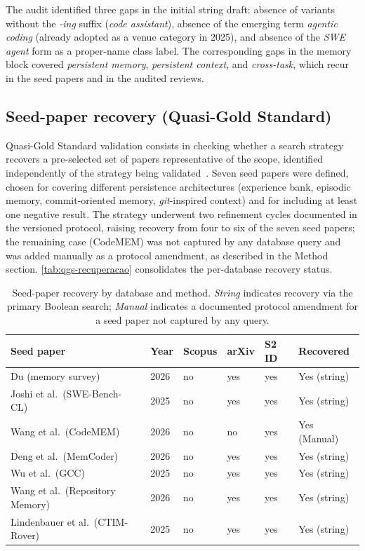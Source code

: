 The audit identified three gaps in the initial string draft: absence of variants without the
\textit{-ing} suffix (\textit{code assistant}), absence of the emerging term \textit{agentic
coding} (already adopted as a venue category in 2025), and absence of the \textit{SWE agent}
form as a proper-name class label.
The corresponding gaps in the memory block covered \textit{persistent memory},
\textit{persistent context}, and \textit{cross-task}, which recur in the seed papers and in
the audited reviews.

\subsection{Seed-paper recovery (Quasi-Gold Standard)}
\label{ap:qgs}

Quasi-Gold Standard validation consists in checking whether a search strategy recovers a
pre-selected set of papers representative of the scope, identified independently of the
strategy being validated~\citep{mourao2020hybrid}.
Seven seed papers were defined, chosen for covering different persistence architectures
(experience bank, episodic memory, commit-oriented memory, \textit{git}-inspired context)
and for including at least one negative result.
The strategy underwent two refinement cycles documented in the versioned protocol, raising
recovery from four to six of the seven seed papers; the remaining case (CodeMEM) was not
captured by any database query and was added manually as a protocol amendment, as
described in the Method section.
\autoref{tab:qgs-recuperacao} consolidates the per-database recovery status.

\begin{table}[htbp]
\centering
\caption{Seed-paper recovery by database and method. \textit{String} indicates recovery via
the primary Boolean search; \textit{Manual} indicates a documented protocol amendment
for a seed paper not captured by any query.}
\label{tab:qgs-recuperacao}
\small
\begin{tabular}{p{3.5cm}p{1cm}p{1.5cm}p{1.2cm}p{1.5cm}p{2cm}}
\toprule
\textbf{Seed paper} & \textbf{Year} & \textbf{Scopus} & \textbf{arXiv} & \textbf{S2 ID} & \textbf{Recovered} \\
\midrule
Du (memory survey)~\citep{du2026memory} & 2026 & no & yes & yes & Yes (string) \\
Joshi et al.\ (SWE-Bench-CL)~\citep{joshi2025swebenchcl} & 2025 & no & yes & yes & Yes (string) \\
Wang et al.\ (CodeMEM)~\citep{wang2026codemem} & 2026 & no & no & yes & Yes (Manual) \\
Deng et al.\ (MemCoder)~\citep{deng2026memcoder} & 2026 & no & yes & yes & Yes (string) \\
Wu et al.\ (GCC)~\citep{wu2025gcc} & 2025 & no & yes & yes & Yes (string) \\
Wang et al.\ (Repository Memory)~\citep{wang2026improving} & 2026 & no & yes & yes & Yes (string) \\
Lindenbauer et al.\ (CTIM-Rover)~\citep{lindenbauer2025ctimrover} & 2025 & no & yes & yes & Yes (string) \\
\bottomrule
\end{tabular}
\end{table}


